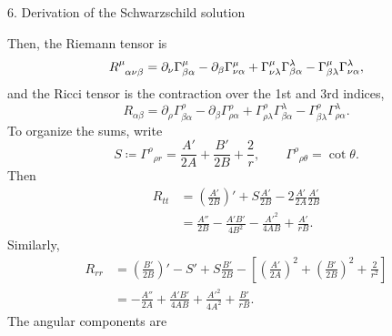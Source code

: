 \documentclass[11pt]{article}
\begin{document}
\begin{problem}{6. Derivation of the Schwarzschild solution}
\begin{enumerate}[label=(\alph*)]
\begin{answer}
          Then, the Riemann tensor is
          \begin{equation}
          \label{eq:5}
          \tensor{R}{^{\mu}_{\alpha\nu\beta} } = \partial_{\nu}\Gamma_{\beta\alpha}^{\mu} - \partial_{\beta}\Gamma_{\nu\alpha}^{\mu} + \Gamma_{\nu\lambda}^{\mu}\Gamma_{\beta\alpha}^{\lambda} - \Gamma_{\beta\lambda}^{\mu}\Gamma_{\nu\alpha}^{\lambda},
          \end{equation}
          and the Ricci tensor is the contraction over the 1st and 3rd indices,
          \begin{equation}
          \label{eq:p6-ricci}
          R_{\alpha\beta} = \partial_{\rho}\Gamma_{\beta\alpha}^{\rho} - \partial_{\beta}\Gamma_{\rho\alpha}^{\rho} + \Gamma_{\rho\lambda}^{\rho}\Gamma_{\beta\alpha}^{\lambda} - \Gamma_{\beta\lambda}^{\rho}\Gamma_{\rho\alpha}^{\lambda}.
        \end{equation}
        To organize the sums, write
        \begin{equation}
          \label{eq:p6-traces}
          S\coloneq \Gamma^\rho{}_{\rho r}=\frac{A'}{2A}+\frac{B'}{2B}+\frac2r,
          \qquad \Gamma^\rho{}_{\rho\theta}=\cot\theta.
        \end{equation}
        Then
        \begin{equation}
          \label{eq:7}
          \begin{aligned}
            R_{tt}
            &=\left(\frac{A'}{2B}\right)'+S\frac{A'}{2B}
              -2\frac{A'}{2A}\frac{A'}{2B}\\
            &=\frac{A''}{2B}-\frac{A'B'}{4B^2}
              -\frac{A'^2}{4AB}+\frac{A'}{rB}.
          \end{aligned}
        \end{equation}
        Similarly,
        \begin{equation}
          \label{eq:3}
          \begin{aligned}
            R_{rr}
            &=\left(\frac{B'}{2B}\right)'-S'
              +S\frac{B'}{2B}
              -\left[\left(\frac{A'}{2A}\right)^2
              +\left(\frac{B'}{2B}\right)^2+\frac2{r^2}\right]\\
            &=-\frac{A''}{2A}+\frac{A'B'}{4AB}
              +\frac{A'^2}{4A^2}+\frac{B'}{rB}.
          \end{aligned}
        \end{equation}
        The angular components are
        \begin{equation}
          \label{eq:6}
          \begin{aligned}

\end{aligned}
\end{equation}
\end{answer}
\end{enumerate}
\end{problem}
\end{document}
